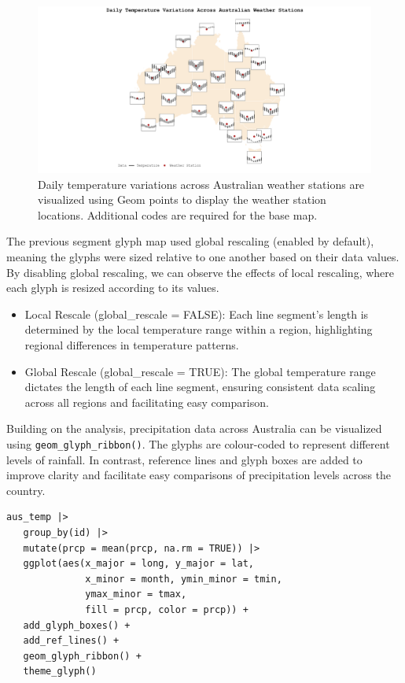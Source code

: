 \begin{figure}

{\centering \includegraphics[width=1\linewidth]{figures/temp_var} 

}

\caption{Daily temperature variations across Australian weather stations are visualized using Geom points to display the weather station locations. Additional codes are required for the base map.}\label{fig:unnamed-chunk-9}
\end{figure}

The previous segment glyph map used global rescaling (enabled by default), meaning the glyphs were sized relative to one another based on their data values. By disabling global rescaling, we can observe the effects of local rescaling, where each glyph is resized according to its values.

\begin{itemize}
\tightlist
\item
  Local Rescale (global\_rescale = FALSE): Each line segment's length is determined by the local temperature range within a region, highlighting regional differences in temperature patterns.
\item
  Global Rescale (global\_rescale = TRUE): The global temperature range dictates the length of each line segment, ensuring consistent data scaling across all regions and facilitating easy comparison.
\end{itemize}

Building on the analysis, precipitation data across Australia can be visualized using \texttt{geom\_glyph\_ribbon()}. The glyphs are colour-coded to represent different levels of rainfall. In contrast, reference lines and glyph boxes are added to improve clarity and facilitate easy comparisons of precipitation levels across the country.

\begin{verbatim}
aus_temp |>
   group_by(id) |>
   mutate(prcp = mean(prcp, na.rm = TRUE)) |>
   ggplot(aes(x_major = long, y_major = lat,
              x_minor = month, ymin_minor = tmin,
              ymax_minor = tmax, 
              fill = prcp, color = prcp)) +
   add_glyph_boxes() +
   add_ref_lines() +
   geom_glyph_ribbon() +
   theme_glyph()
\end{verbatim}

